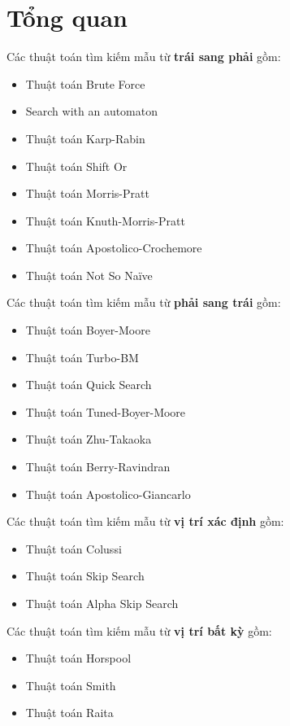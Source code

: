 \documentclass[12pt,twoside,openright]{extreport}
\begin{document}
\tableofcontents

\chapter{Tổng quan}

Các thuật toán tìm kiếm mẫu từ \textbf{trái sang phải} gồm:
\begin{itemize}
	\item Thuật toán Brute Force
	\item Search with an automaton
	\item Thuật toán Karp-Rabin
	\item Thuật toán Shift Or
	\item Thuật toán Morris-Pratt
	\item Thuật toán Knuth-Morris-Pratt
	\item Thuật toán Apostolico-Crochemore
	\item Thuật toán Not So Naïve
\end{itemize}

Các thuật toán tìm kiếm mẫu từ \textbf{phải sang trái} gồm:
\begin{itemize}
	\item Thuật toán Boyer-Moore
	\item Thuật toán Turbo-BM
	\item Thuật toán Quick Search
	\item Thuật toán Tuned-Boyer-Moore
	\item Thuật toán Zhu-Takaoka
	\item Thuật toán Berry-Ravindran
	\item Thuật toán Apostolico-Giancarlo
\end{itemize}

Các thuật toán tìm kiếm mẫu từ \textbf{vị trí xác định} gồm:
\begin{itemize}
	\item Thuật toán Colussi
	\item Thuật toán Skip Search
	\item Thuật toán Alpha Skip Search
\end{itemize}

Các thuật toán tìm kiếm mẫu từ \textbf{vị trí bất kỳ} gồm:
\begin{itemize}
	\item Thuật toán Horspool
	\item Thuật toán Smith
	\item Thuật toán Raita
\end{itemize}
\end{document}
